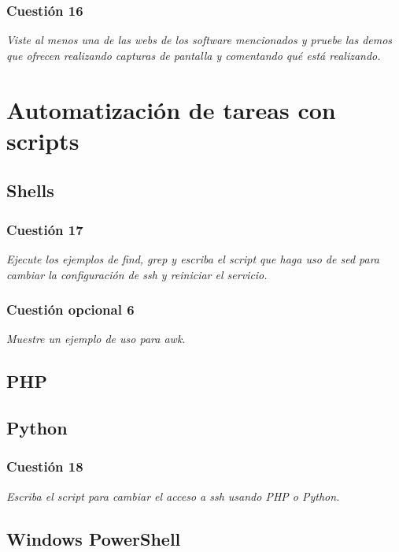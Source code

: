 \subsubsection{Cuestión 16}
\textit{Viste al menos una de las webs de los software mencionados y pruebe las demos que ofrecen realizando capturas de pantalla y comentando qué está realizando.}


\section{Automatización de tareas con scripts}
\subsection{Shells}
\subsubsection{Cuestión 17}
\textit{Ejecute los ejemplos de find, grep y escriba el script que haga uso de sed para cambiar la configuración de ssh y reiniciar el servicio.}

\subsubsection{Cuestión opcional 6}
\textit{Muestre un ejemplo de uso para awk.}


\subsection{PHP}
\subsection{Python}
\subsubsection{Cuestión 18}
\textit{Escriba el script para cambiar el acceso a ssh usando PHP o Python.}


\subsection{Windows PowerShell}
